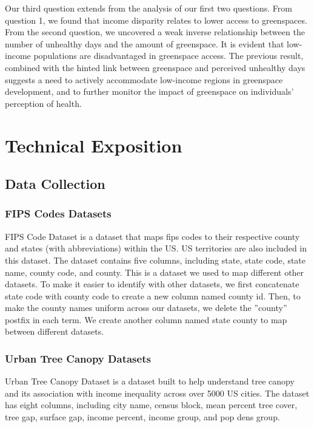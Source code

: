 \documentclass{article}
\begin{document}
Our third question extends from the analysis of our first two questions. From question 1, we found that income disparity relates to lower access to greenspaces. From the second question, we uncovered a weak inverse relationship between the number of unhealthy days and the amount of greenspace. It is evident that low-income populations are disadvantaged in greenspace access. The previous result, combined with the hinted link between greenspace and perceived unhealthy days suggests a need to actively accommodate low-income regions in greenspace development, and to further monitor the impact of greenspace on individuals’ perception of health.



\section{Technical Exposition}

\subsection{Data Collection}

\subsubsection{FIPS Codes Datasets}
FIPS Code Dataset is a dataset that maps fips codes to their respective county and states (with abbreviations) within the US. US territories are also included in this dataset. The dataset contains five columns, including state, state code, state name, county code, and county. This is a dataset we used to map different other datasets. To make it easier to identify with other datasets, we first concatenate state code with county code to create a new column named county id. Then, to make the county names uniform across our datasets, we delete the ”county” postfix in each term. We create another column named state county to map between different datasets. 



\subsubsection{Urban Tree Canopy Datasets}

Urban Tree Canopy Dataset is a dataset built to help understand tree canopy and its association with income inequality across over 5000 US cities. The dataset has eight columns, including city name, census block, mean percent tree cover, tree gap, surface gap, income percent, income group, and pop dens group. 
\end{document}
